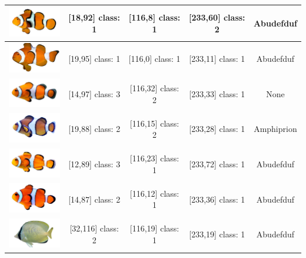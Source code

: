 \begin{longtable}{|c|c|c|c|c|}
	\includegraphics[width=3cm]{gambar/dataset_validasi/Amphiprion20} & [18,92] class: 1 & [116,8] class: 1 & [233,60] class: 2 & Abudefduf \\ \hline
	\includegraphics[width=3cm]{gambar/dataset_validasi/Amphiprion21} & [19,95] class: 1 & [116,0] class: 1 & [233,11] class: 1 & Abudefduf \\ \hline
	\includegraphics[width=3cm]{gambar/dataset_validasi/Amphiprion22} & [14,97] class: 3 & [116,32] class: 2 & [233,33] class: 1 & None \\ \hline
	\includegraphics[width=3cm]{gambar/dataset_validasi/Amphiprion23} & [19,88] class: 2 & [116,15] class: 2 & [233,28] class: 1 & Amphiprion \\ \hline
	\includegraphics[width=3cm]{gambar/dataset_validasi/Amphiprion24} & [12,89] class: 3 & [116,23] class: 1 & [233,72] class: 1 & Abudefduf \\ \hline
	\includegraphics[width=3cm]{gambar/dataset_validasi/Amphiprion25} & [14,87] class: 2 & [116,12] class: 1 & [233,36] class: 1 & Abudefduf \\ \hline
	\includegraphics[width=3cm]{gambar/dataset_validasi/Chaetodon01} & [32,116] class: 2 & [116,19] class: 1 & [233,19] class: 1 & Abudefduf \\ \hline

\end{longtable}
